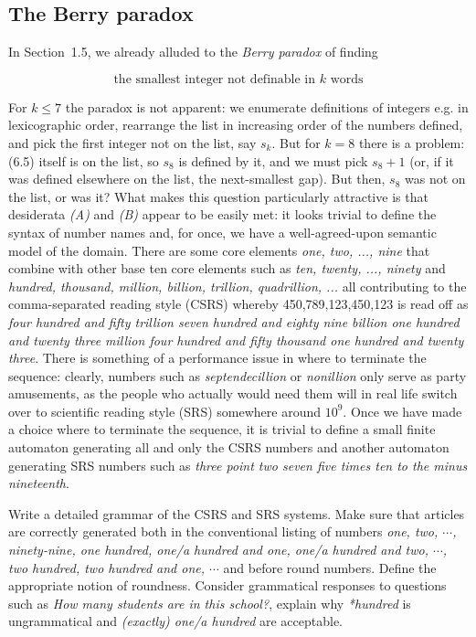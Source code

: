 \subsection{The Berry paradox}

In Section~1.5, we already alluded to the {\it Berry paradox} of finding

\begin{equation}
\mbox{the smallest integer not definable in $k$ words} 
\end{equation}

\noindent 
For $k \leq 7$ the paradox is not apparent: we enumerate definitions of
integers e.g. in lexicographic order, rearrange the list in increasing order
of the numbers defined, and pick the first integer not on the list, say $s_k$.
But for $k=8$ there is a problem: (6.5) itself is on the list, so $s_8$ is
defined by it, and we must pick $s_8+1$ (or, if it was defined elsewhere on
the list, the next-smallest gap). But then, $s_8$ was not on the list, or was
it?  What makes this question particularly attractive is that desiderata {\sl
  (A)} and {\sl (B)} appear to be easily met: it looks trivial to define the
syntax of number names and, for once, we have a well-agreed-upon semantic
model of the domain. There are some core elements {\it one, two, ..., nine}
that combine with other base ten core elements such as {\it ten, twenty, ...,
  ninety} and {\it hundred, thousand, million, billion, trillion, quadrillion,
  ...} all contributing to the comma-separated reading style (CSRS) whereby
450,789,123,450,123 is read off as {\it four hundred and fifty trillion seven
  hundred and eighty nine billion one hundred and twenty three million four
  hundred and fifty thousand one hundred and twenty three}.  There is
something of a performance issue in where to terminate the sequence: clearly,
numbers such as {\it septendecillion} or {\it nonillion} only serve as party
amusements, as the people who actually would need them will in real life
switch over to scientific reading style (SRS) somewhere around $10^9$.  Once
we have made a choice where to terminate the sequence, it is trivial to define
a small finite automaton generating all and only the CSRS numbers and another
automaton generating SRS numbers such as {\it three point two seven five times
  ten to the minus nineteenth}.

\smallskip{} Write a detailed grammar of the CSRS
and SRS systems. Make sure that articles are correctly generated both in the
conventional listing of numbers {\it one, two, $\cdots$, ninety-nine, one
  hundred, one/a hundred and one, one/a hundred and two, $\cdots$, two
  hundred, two hundred and one, $\cdots$} and before round numbers. Define the
appropriate notion of roundness. Consider grammatical responses to questions
such as {\it How many students are in this school?}, explain why {\it
  *hundred} is ungrammatical and {\it (exactly) one/a hundred} are acceptable.

